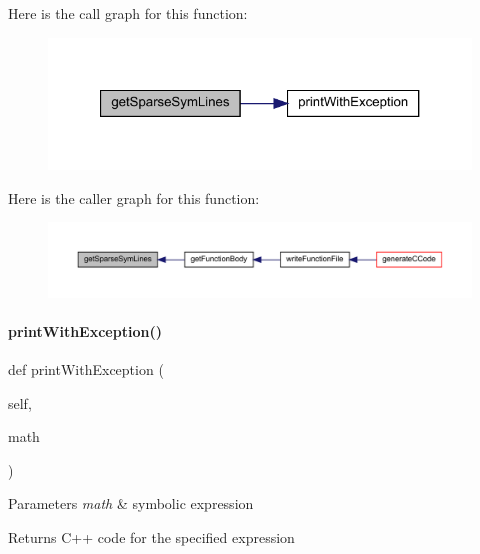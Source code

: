 Here is the call graph for this function\+:
\nopagebreak
\begin{figure}[H]
\begin{center}
\leavevmode
\includegraphics[width=321pt]{classamici_1_1sbml__import_1_1_sbml_importer_a894c764b5114ad7b5c0ae2ec1e4e6b36_cgraph}
\end{center}
\end{figure}
Here is the caller graph for this function\+:
\nopagebreak
\begin{figure}[H]
\begin{center}
\leavevmode
\includegraphics[width=350pt]{classamici_1_1sbml__import_1_1_sbml_importer_a894c764b5114ad7b5c0ae2ec1e4e6b36_icgraph}
\end{center}
\end{figure}
\mbox{\label{classamici_1_1sbml__import_1_1_sbml_importer_a8628c4bc7d378583201bf3681bcd0559}} 
\paragraph{\texorpdfstring{print\+With\+Exception()}{printWithException()}}
{\footnotesize\ttfamily def print\+With\+Exception (\begin{DoxyParamCaption}\item[{}]{self,  }\item[{}]{math }\end{DoxyParamCaption})}


\begin{DoxyParams}{Parameters}
{\em math} & symbolic expression\\
\hline
\end{DoxyParams}
\begin{DoxyReturn}{Returns}
C++ code for the specified expression
\end{DoxyReturn}

